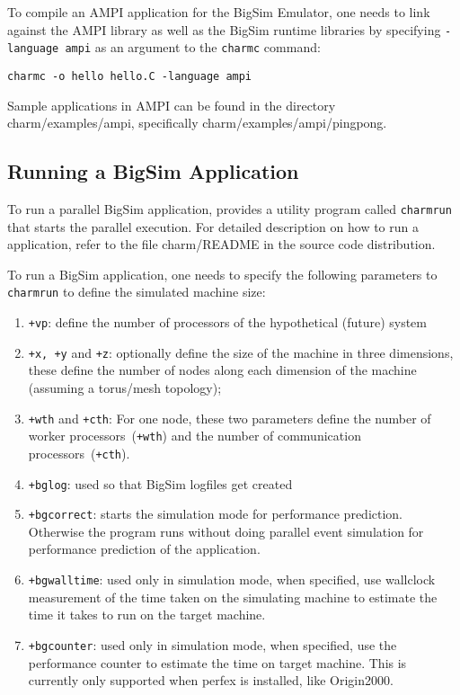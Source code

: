 To compile an AMPI application for the BigSim Emulator, one needs to link
against the AMPI library as well as the BigSim \charmpp{} runtime libraries by
specifying \texttt{-language ampi} as an argument to the {\tt charmc} command:
\begin{verbatim}
charmc -o hello hello.C -language ampi
\end{verbatim}

Sample applications in AMPI can be found in the directory charm/examples/ampi,
specifically charm/examples/ampi/pingpong.

\subsection{Running a BigSim Application}

To run a parallel BigSim application, \charmpp{} provides a utility program
called {\tt charmrun} that starts the parallel execution.  For detailed
description on how to run a \charmpp{} application, refer to the file
charm/README in the source code distribution.

To run a BigSim application, one needs to specify the following parameters to
{\tt charmrun} to define the simulated machine size:

\begin{enumerate}

\item {\tt +vp}: define the number of processors of the hypothetical (future)
system
\item {\tt +x, +y} and {\tt +z}:  optionally define the size of the machine in
three dimensions, these define the number of nodes along each dimension of the
machine (assuming a torus/mesh topology);
\item {\tt +wth} and {\tt +cth}:  For one node, these two parameters define the
number of worker processors~({\tt +wth}) and the number of communication
processors~({\tt +cth}).
\item {\tt +bglog}: used so that BigSim logfiles get created
\item {\tt +bgcorrect}: starts the simulation mode for performance prediction.
Otherwise the program runs without doing parallel event simulation for
performance prediction of the application.
\item {\tt +bgwalltime}: used only in simulation mode, when specified, use
wallclock measurement of the time taken on the simulating machine to estimate
the time it takes to run on the target machine.
\item {\tt +bgcounter}:  used only in simulation mode, when specified, use the
performance counter to estimate the time on target machine. This is currently
only supported when perfex is installed, like Origin2000.
\end{enumerate}

